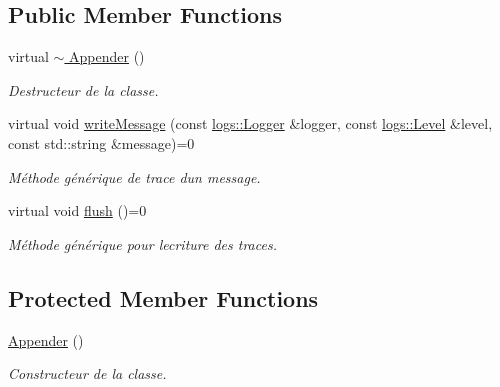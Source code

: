 \subsection*{Public Member Functions}
\begin{DoxyCompactItemize}
\item 
\mbox{\label{classlogs_1_1Appender_a253afd272c37d4f76c0e26228d7a892f}} 
virtual \hyperlink{classlogs_1_1Appender_a253afd272c37d4f76c0e26228d7a892f}{$\sim$ Appender} ()
\begin{DoxyCompactList}\small\item\em Destructeur de la classe. \end{DoxyCompactList}\item 
virtual void \hyperlink{classlogs_1_1Appender_a940a63ebc17c8e29c1922948903c60e1}{write\+Message} (const \hyperlink{classlogs_1_1Logger}{logs\+::\+Logger} \&logger, const \hyperlink{classlogs_1_1Level}{logs\+::\+Level} \&level, const std\+::string \&message)=0
\begin{DoxyCompactList}\small\item\em Méthode générique de trace d\textquotesingle{}un message. \end{DoxyCompactList}\item 
\mbox{\label{classlogs_1_1Appender_ad682aa0a59e34dc962e4abec5e9b1722}} 
virtual void \hyperlink{classlogs_1_1Appender_ad682aa0a59e34dc962e4abec5e9b1722}{flush} ()=0
\begin{DoxyCompactList}\small\item\em Méthode générique pour l\textquotesingle{}ecriture des traces. \end{DoxyCompactList}\end{DoxyCompactItemize}
\subsection*{Protected Member Functions}
\begin{DoxyCompactItemize}
\item 
\mbox{\label{classlogs_1_1Appender_a6c2acb37a497bad50ecb8bb13f906569}} 
\hyperlink{classlogs_1_1Appender_a6c2acb37a497bad50ecb8bb13f906569}{Appender} ()
\begin{DoxyCompactList}\small\item\em Constructeur de la classe. \end{DoxyCompactList}\end{DoxyCompactItemize}


